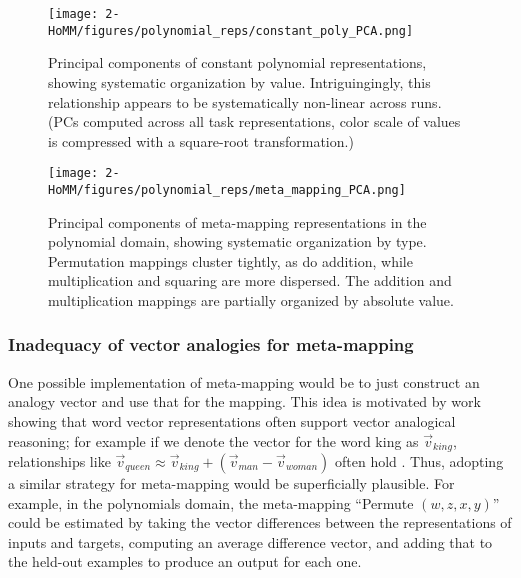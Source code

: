 \begin{figure}[ptbh]
\centering
\texttt{[image: 2-HoMM/figures/polynomial\_reps/constant\_poly\_PCA.png]}
\caption[Principal components of constant polynomial representations, showing systematic organization by value.]{Principal components of constant polynomial representations, showing systematic organization by value. Intriguingingly, this relationship appears to be systematically non-linear across runs. (PCs computed across all task representations, color scale of values is compressed with a square-root transformation.)} \label{fig:HoMM_polynomials:reps_const_poly_PCA}
\end{figure}

\begin{figure}[ptbh]
\centering
\texttt{[image: 2-HoMM/figures/polynomial\_reps/meta\_mapping\_PCA.png]}
\caption[Principal components of meta-mapping representations in the polynomial domain, showing systematic organization by type.]{Principal components of meta-mapping representations in the polynomial domain, showing systematic organization by type. Permutation mappings cluster tightly, as do addition, while multiplication and squaring are more dispersed. The addition and multiplication mappings are partially organized by absolute value.} \label{fig:HoMM_polynomials:reps_meta_mapping_PCA}
\end{figure}

\subsubsection{Inadequacy of vector analogies for meta-mapping} \label{sec:HoMM:vector_analogies_inadequate}

One possible implementation of meta-mapping would be to just construct an analogy vector and use that for the mapping. This idea is motivated by work showing that word vector representations often support vector analogical reasoning; for example if we denote the vector for the word king as \(\vec{v}_{king}\), relationships like \(\vec{v}_{queen} \approx \vec{v}_{king} + \left(\vec{v}_{man} - \vec{v}_{woman} \right)\) often hold \citep{Mikolov2013}. Thus, adopting a similar strategy for meta-mapping would be superficially plausible. For example, in the polynomials domain, the meta-mapping ``Permute \((w, z, x, y)\)'' could be estimated by taking the vector differences between the representations of inputs and targets, computing an average difference vector, and adding that to the held-out examples to produce an output for each one.

